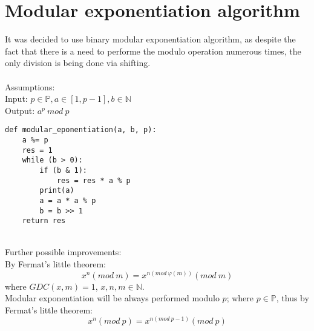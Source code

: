 \documentclass{report}
\begin{document}
\section{Modular exponentiation algorithm}
It was decided to use binary modular exponentiation algorithm, as despite the fact that there is a need to performe the modulo operation numerous times, the only division is being done via shifting. \\ \\
Assumptions:\\
Input: $p \in\mathbb{P}, a\in[1,p-1], b\in\mathbb{N}$\\
Output: $a^{p}\: mod\: p$ \\
\begin{lstlisting}[caption=Modular exponentiation algorithm]
def modular_eponentiation(a, b, p):
    a %= p
    res = 1
    while (b > 0):
        if (b & 1):
            res = res * a % p
        print(a)
        a = a * a % p
        b = b >> 1
    return res  
\end{lstlisting}\\
Further possible improvements:\\

By Fermat's little theorem:
\begin{equation} %
  x^n(mod\: m) = x^{n (mod\: \varphi(m))}(mod\: m)
\end{equation}
where $GDC(x, m) = 1$, $x,n,m\in \mathbb{N}$.\\

Modular exponentiation will be always performed modulo $p$; where $p\in\mathbb{P}$, thus by Fermat's little theorem:
\begin{equation} %
  x^n(mod\: p) = x^{n (mod\: p - 1)}(mod\: p)
\end{equation}
\end{document}
